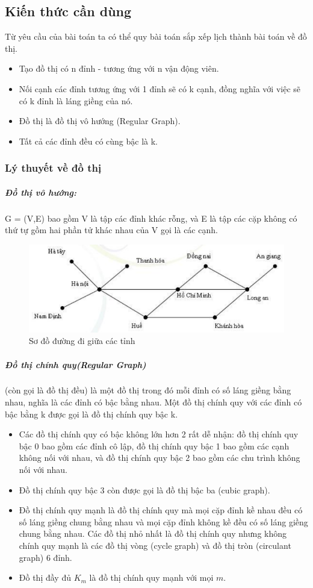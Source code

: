 \documentclass[13pt,a4paper]{article}
\begin{document}
\subsection{Kiến thức cần dùng}
Từ yêu cầu của bài toán ta có thể quy bài toán sắp xếp lịch thành bài toán về đồ thị.
\begin{itemize}
	\item Tạo đồ thị có n đỉnh - tương ứng với n vận động viên.
	\item Nối cạnh các đỉnh tương ứng với 1 đỉnh sẽ có k cạnh, đồng nghĩa với việc sẽ có k đỉnh là láng giềng của nó.
	\item Đồ thị là đồ thị vô hướng (Regular Graph).
	\item Tất cả các đỉnh đều có cùng bậc là k.
\end{itemize}
\subsubsection*{Lý thuyết về đồ thị}
\subparagraph{Đồ thị vô hướng:}G = (V,E) bao gồm V là tập các đỉnh khác rỗng, và E là tập các cặp không có thứ tự gồm hai phần tử khác
nhau của V gọi là các cạnh.
\begin{figure}[H]
	\begin{center}
	\includegraphics[scale=0.7]{./image/dothi_ex.png}
	\caption{Sơ đồ đường đi giữa các tỉnh}
	\end{center}
\end{figure}
\subparagraph{Đồ thị chính quy(Regular Graph)}(còn gọi là đồ thị đều) là một đồ thị trong đó mỗi đỉnh có số láng giềng bằng nhau, nghĩa là các đỉnh có bậc bằng nhau. Một đồ thị chính quy với các đỉnh có bậc bằng k được gọi là đồ thị chính quy bậc k.
\begin{itemize}
	\item Các đồ thị chính quy có bậc không lớn hơn 2 rất dễ nhận: đồ thị chính quy bậc 0 bao gồm các đỉnh cô lập, đồ thị chính quy bậc 1 bao gồm các cạnh không nối với nhau, và đồ thị chính quy bậc 2 bao gồm các chu trình không nối với nhau.
	\item Đồ thị chính quy bậc 3 còn được gọi là đồ thị bậc ba (cubic graph).
	\item Đồ thị chính quy mạnh là đồ thị chính quy mà mọi cặp đỉnh kề nhau đều có số láng giềng chung bằng nhau và mọi cặp đỉnh không kề đều có số láng giềng chung bằng nhau. Các đồ thị nhỏ nhất là đồ thị chính quy nhưng không chính quy mạnh là các đồ thị vòng (cycle graph) và đồ thị tròn (circulant graph) 6 đỉnh.
	\item Đồ thị đầy đủ $ K_{m}$ là đồ thị chính quy mạnh với mọi $ m$.
\end{itemize}
\end{document}
